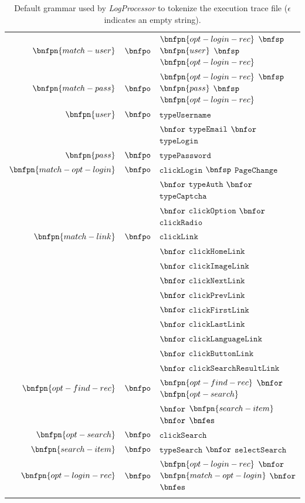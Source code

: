 \documentclass[10pt, conference, compsocconf]{IEEEtran}
\begin{document}
\begin{table}[!htb]
\begin{tabular}{rcl}
  $\bnfpn{match-user}$ & $\bnfpo$ &  $\bnfpn{opt-login-rec}$ $\bnfsp$ $\bnfpn{user}$ $\bnfsp$ $\bnfpn{opt-login-rec}$ \\
  
  $\bnfpn{match-pass}$ & $\bnfpo$ &  $\bnfpn{opt-login-rec}$ $\bnfsp$ $\bnfpn{pass}$ $\bnfsp$ $\bnfpn{opt-login-rec}$ \\
  
  $\bnfpn{user}$ & $\bnfpo$ &  $\texttt{typeUsername}$ \\
  & & $\bnfor$ $\texttt{typeEmail}$ $\bnfor$ $\texttt{typeLogin}$ \\
  
  $\bnfpn{pass}$ & $\bnfpo$ &  $\texttt{typePassword}$ \\
  
  $\bnfpn{match-opt-login}$ & $\bnfpo$ &  $\texttt{clickLogin}$ $\bnfsp$ $\texttt{PageChange}$ \\
  & & $\bnfor$ $\texttt{typeAuth}$ $\bnfor$ $\texttt{typeCaptcha}$ \\
  & & $\bnfor$ $\texttt{clickOption}$ $\bnfor$ $\texttt{clickRadio}$ \\
  
  $\bnfpn{match-link}$ & $\bnfpo$ &  $\texttt{clickLink}$ \\
   & & $\bnfor$ $\texttt{clickHomeLink}$ \\
   & & $\bnfor$ $\texttt{clickImageLink}$ \\
   & & $\bnfor$ $\texttt{clickNextLink}$ \\
   & & $\bnfor$ $\texttt{clickPrevLink}$ \\
   & & $\bnfor$ $\texttt{clickFirstLink}$ \\
   & & $\bnfor$ $\texttt{clickLastLink}$ \\
   & & $\bnfor$ $\texttt{clickLanguageLink}$ \\
   & & $\bnfor$ $\texttt{clickButtonLink}$ \\
   & & $\bnfor$ $\texttt{clickSearchResultLink}$ \\
  
  $\bnfpn{opt-find-rec}$ & $\bnfpo$ &  $\bnfpn{opt-find-rec}$ $\bnfor$ $\bnfpn{opt-search}$ \\
  & & $\bnfor$ $\bnfpn{search-item}$ $\bnfor$ $\bnfes$ \\
  
  $\bnfpn{opt-search}$ & $\bnfpo$ &  $\texttt{clickSearch}$ \\
  
  $\bnfpn{search-item}$ & $\bnfpo$ &  $\texttt{typeSearch}$ $\bnfor$ $\texttt{selectSearch}$ \\
  
  $\bnfpn{opt-login-rec}$ & $\bnfpo$ &  $\bnfpn{opt-login-rec}$ $\bnfor$ $\bnfpn{match-opt-login}$ $\bnfor$ $\bnfes$ \\
  & & \\
  \end{tabular}
\caption{Default grammar used by \textit{LogProcessor} to tokenize the execution trace file ($\epsilon$ indicates an empty string).}
\label{tab:grammar}
\end{table}
\end{document}
